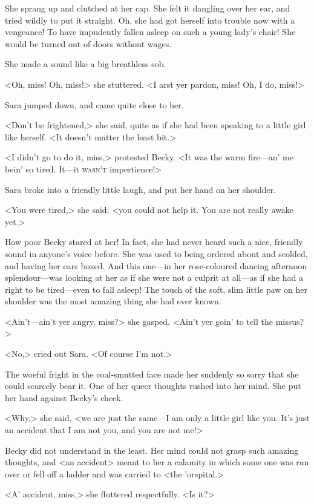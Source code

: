 She sprang up and clutched at her cap. She felt it dangling over her ear, and tried wildly to put it straight. Oh, she had got herself into trouble now with a vengeance! To have impudently fallen asleep on such a young lady's chair! She would be turned out of doors without wages.

She made a sound like a big breathless sob.

<Oh, miss! Oh, miss!> she stuttered. <I arst yer pardon, miss! Oh, I do, miss!>

Sara jumped down, and came quite close to her.

<Don't be frightened,> she said, quite as if she had been speaking to a little girl like herself. <It doesn't matter the least bit.>

<I didn't go to do it, miss,> protested Becky. <It was the warm fire—an' me bein' so tired. It—it \textsc{wasn't} impertience!>

Sara broke into a friendly little laugh, and put her hand on her shoulder.

<You were tired,> she said; <you could not help it. You are not really awake yet.>

How poor Becky stared at her! In fact, she had never heard such a nice, friendly sound in anyone's voice before. She was used to being ordered about and scolded, and having her ears boxed. And this one—in her rose-coloured dancing afternoon splendour—was looking at her as if she were not a culprit at all—as if she had a right to be tired—even to fall asleep! The touch of the soft, slim little paw on her shoulder was the most amazing thing she had ever known.

<Ain't—ain't yer angry, miss?> she gasped. <Ain't yer goin' to tell the missus?>

<No,> cried out Sara. <Of course I'm not.>

The woeful fright in the coal-smutted face made her suddenly so sorry that she could scarcely bear it. One of her queer thoughts rushed into her mind. She put her hand against Becky's cheek.

<Why,> she said, <we are just the same—I am only a little girl like you. It's just an accident that I am not you, and you are not me!>

Becky did not understand in the least. Her mind could not grasp such amazing thoughts, and <an accident> meant to her a calamity in which some one was run over or fell off a ladder and was carried to <the 'orspital.>

<A' accident, miss,> she fluttered respectfully. <Is it?>

